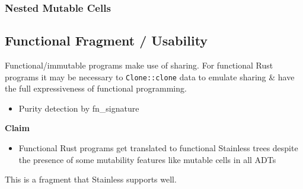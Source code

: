 \subsubsection{Nested Mutable Cells}




\subsection{Functional Fragment / Usability}

Functional/immutable programs make use of sharing. For functional Rust
programs it may be necessary to \passthrough{\lstinline!Clone::clone!}
data to emulate sharing \& have the full expressiveness of functional
programming.

\begin{itemize}
\tightlist
\item
  Purity detection by fn\_signature
\end{itemize}

\textbf{Claim}

\begin{itemize}
\tightlist
\item
  Functional Rust programs get translated to functional Stainless trees
  despite the presence of some mutability features like mutable cells in
  all ADTs
\end{itemize}

This is a fragment that Stainless supports well.
